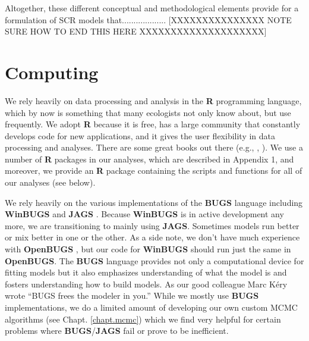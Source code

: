 Altogether, these different conceptual and methodological elements
provide for a formulation of SCR models that...................
[XXXXXXXXXXXXXXX NOTE SURE HOW TO END THIS HERE XXXXXXXXXXXXXXXXXXXX]


\section*{Computing}

We rely heavily on data processing and analysis in the {\bf R}
programming language, which by now is something that many ecologists
not only know about, but use frequently.  We adopt {\bf R} because it
is free, has a large community that constantly develops code for new
applications, and it gives the user flexibility in data processing and
analyses.  There are some great books out there (e.g.,
\citet{bolker:2008}, \citet{zuur_etal:2009}).
We use a number of {\bf
  R} packages in our analyses, which are described in Appendix 1, and
moreover, we provide an {\bf R} package containing the scripts and
functions for all of our analyses (see below).

We rely heavily on the various implementations of the {\bf BUGS}
language including {\bf WinBUGS} \citep{lunn_etal:2000} and {\bf JAGS}
\citep{plummer:2003}.  Because {\bf WinBUGS} is in active development
any more, we are transitioning to mainly using {\bf JAGS}.  Sometimes
models run better or mix better in one or the other. As a side note,
we don't have much experience with {\bf OpenBUGS}
\citep{thomas_etal:2006}, but our code for {\bf WinBUGS} should run
just the same in {\bf OpenBUGS}. The {\bf BUGS} language provides not
only a computational device for fitting models but it also emphasizes
understanding of what the model is and fosters understanding how to
build models.  As our good colleague Marc K\'{e}ry wrote 
\citep[][p. 30]{kery:2010}
``BUGS frees the modeler in you.'' 
While we mostly use {\bf BUGS} implementations,
we do a limited amount of developing our own custom MCMC algorithms
(see Chapt. \ref{chapt.mcmc}) which we find very helpful for certain
problems where {\bf BUGS}/{\bf JAGS} fail or prove to be inefficient.

